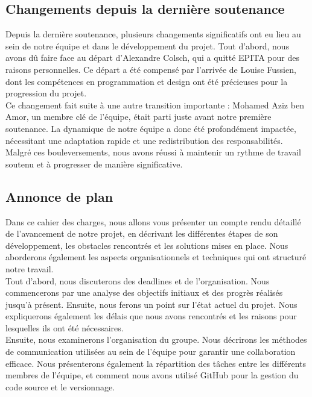 \subsection{Changements depuis la dernière soutenance}


Depuis la dernière soutenance, plusieurs changements significatifs ont eu lieu au sein de notre équipe et dans le développement du projet.
Tout d'abord, nous avons dû faire face au départ d'Alexandre Colsch, qui a quitté EPITA  pour des raisons personnelles.
Ce départ a été compensé par l'arrivée de Louise Fussien, dont les compétences en programmation et design ont été précieuses pour la progression du projet.
\\

Ce changement fait suite à une autre transition importante : Mohamed Aziz ben Amor, un membre clé de l'équipe, était parti juste avant notre première soutenance.
La dynamique de notre équipe a donc été profondément impactée, nécessitant une adaptation rapide et une redistribution des responsabilités.
\\

Malgré ces bouleversements, nous avons réussi à maintenir un rythme de travail soutenu et à progresser de manière significative.
\\

\subsection{Annonce de plan}

Dans ce cahier des charges, nous allons vous présenter un compte rendu détaillé de l'avancement de notre projet, en décrivant les différentes étapes de son développement, les obstacles rencontrés et les solutions mises en place.
Nous aborderons également les aspects organisationnels et techniques qui ont structuré notre travail.
\\

Tout d'abord, nous discuterons des deadlines et de l'organisation.
Nous commencerons par une analyse des objectifs initiaux et des progrès réalisés jusqu'à présent.
Ensuite, nous ferons un point sur l'état actuel du projet. Nous expliquerons également les délais que nous avons rencontrés et les raisons pour lesquelles ils ont été nécessaires.
\\

Ensuite, nous examinerons l'organisation du groupe. Nous décrirons les méthodes de communication utilisées au sein de l'équipe pour garantir une collaboration efficace.
Nous présenterons également la répartition des tâches entre les différents membres de l'équipe, et comment nous avons utilisé GitHub pour la gestion du code source et le versionnage.
\\

